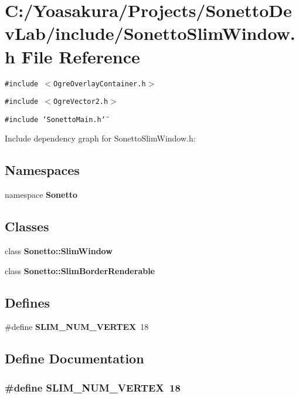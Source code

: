 \section{C:/Yoasakura/Projects/SonettoDevLab/include/SonettoSlimWindow.h File Reference}
\label{_sonetto_slim_window_8h}
{\tt \#include $<$OgreOverlayContainer.h$>$}\par
{\tt \#include $<$OgreVector2.h$>$}\par
{\tt \#include \char`\"{}SonettoMain.h\char`\"{}}\par


Include dependency graph for SonettoSlimWindow.h:\subsection*{Namespaces}
\begin{CompactItemize}
\item 
namespace {\bf Sonetto}
\end{CompactItemize}
\subsection*{Classes}
\begin{CompactItemize}
\item 
class {\bf Sonetto::SlimWindow}
\item 
class {\bf Sonetto::SlimBorderRenderable}
\end{CompactItemize}
\subsection*{Defines}
\begin{CompactItemize}
\item 
\#define {\bf SLIM\_\-NUM\_\-VERTEX}~18
\end{CompactItemize}


\subsection{Define Documentation}
\subsubsection{\setlength{\rightskip}{0pt plus 5cm}\#define SLIM\_\-NUM\_\-VERTEX~18}\label{_sonetto_slim_window_8h_94ab7e5da3c2cbbdbae4bdecd24e0c1a}


